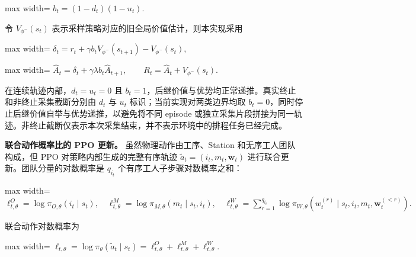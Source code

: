 \documentclass[journal,10pt]{IEEEtran}
\begin{document}
\begin{center}
\begin{adjustbox}{max width=\columnwidth}
$\displaystyle
b_t=(1-d_t)(1-u_t).
$
\end{adjustbox}
\end{center}

令 \(V_{\phi^-}(s_t)\) 表示采样策略对应的旧全局价值估计，则本实现采用

\begin{center}
\begin{adjustbox}{max width=\columnwidth}
$\displaystyle
\delta_t=r_t+\gamma b_tV_{\phi^-}(s_{t+1})-V_{\phi^-}(s_t),
$
\end{adjustbox}
\end{center}

\begin{center}
\begin{adjustbox}{max width=\columnwidth}
$\displaystyle
\widehat A_t=\delta_t+\gamma\lambda b_t\widehat A_{t+1},
\qquad
R_t=\widehat A_t+V_{\phi^-}(s_t).
$
\end{adjustbox}
\end{center}

在连续轨迹内部，\(d_t=u_t=0\) 且 \(b_t=1\)，后继价值与优势均正常递推。真实终止和非终止采集截断分别由 \(d_t\) 与 \(u_t\) 标识；当前实现对两类边界均取 \(b_t=0\)，同时停止后继价值自举与优势递推，以避免将不同 episode 或独立采集片段拼接为同一轨迹。非终止截断仅表示本次采集结束，并不表示环境中的排程任务已经完成。

\textbf{联合动作概率比的 PPO 更新。} 虽然物理动作由工序、Station 和无序工人团队构成，但 PPO 对策略内部生成的完整有序轨迹 \(\widetilde a_t=(i_t,m_t,\mathbf w_t)\) 进行联合更新。团队分量的对数概率是 \(q_{i_t}\) 个有序工人子步骤对数概率之和：

\begin{center}
\begin{adjustbox}{max width=\columnwidth}
$\displaystyle
\ell_{t,\theta}^O=\log\pi_{O,\theta}(i_t\mid s_t),\quad
\ell_{t,\theta}^M=\log\pi_{M,\theta}(m_t\mid s_t,i_t),\quad
\ell_{t,\theta}^W=\sum_{r=1}^{q_{i_t}}
\log\pi_{W,\theta}\!\left(w_t^{(r)}\mid s_t,i_t,m_t,\mathbf w_t^{(<r)}\right).
$
\end{adjustbox}
\end{center}

联合动作对数概率为

\begin{center}
\begin{adjustbox}{max width=\columnwidth}
$\displaystyle
\ell_{t,\theta}
=\log\pi_\theta(\widetilde a_t\mid s_t)
=\ell_{t,\theta}^O+\ell_{t,\theta}^M+\ell_{t,\theta}^W.
$
\end{adjustbox}
\end{center}
\end{document}
